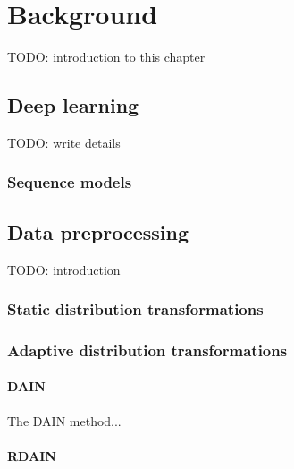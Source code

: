 \documentclass{statsmsc}
\begin{document}

\chapter{Background} %

TODO: introduction to this chapter

\section{Deep learning}%
\label{sec:Deep learning}

TODO: write details

\subsection{Sequence models}%
\label{sub:Sequence models}



\section{Data preprocessing}%
\label{sec:Data preprocessing}

TODO: introduction

\subsection{Static distribution transformations}%
\label{sub:Static distribution transformations}



\subsection{Adaptive distribution transformations}%
\label{sub:Adaptive distribution transformations}

\subsubsection{DAIN}%
\label{ssub:DAIN}

The \ac{DAIN} method...

\subsubsection{RDAIN}%
\label{ssub:RDAIN}
\end{document}
